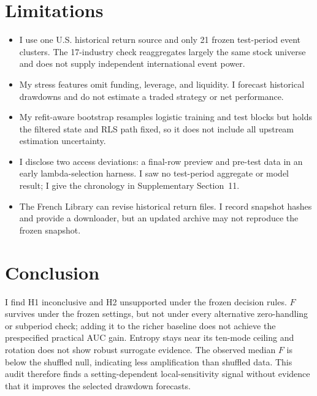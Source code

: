 \documentclass[11pt]{article}
\begin{document}
\section{Limitations}
\begin{itemize}
\item I use one U.S. historical return source and only 21 frozen test-period event clusters. The 17-industry check reaggregates largely the same stock universe and does not supply independent international event power.
\item My stress features omit funding, leverage, and liquidity. I forecast historical drawdowns and do not estimate a traded strategy or net performance.
\item My refit-aware bootstrap resamples logistic training and test blocks but holds the filtered state and RLS path fixed, so it does not include all upstream estimation uncertainty.
\item I disclose two access deviations: a final-row preview and pre-test data in an early lambda-selection harness. I saw no test-period aggregate or model result; I give the chronology in Supplementary Section~11.
\item The French Library can revise historical return files. I record snapshot hashes and provide a downloader, but an updated archive may not reproduce the frozen snapshot.
\end{itemize}

\section{Conclusion}
I find H1 inconclusive and H2 unsupported under the frozen decision rules. $F$ survives under the frozen settings, but not under every alternative zero-handling or subperiod check; adding it to the richer baseline does not achieve the prespecified practical AUC gain. Entropy stays near its ten-mode ceiling and rotation does not show robust surrogate evidence. The observed median $F$ is below the shuffled null, indicating less amplification than shuffled data. This audit therefore finds a setting-dependent local-sensitivity signal without evidence that it improves the selected drawdown forecasts.
\end{document}
